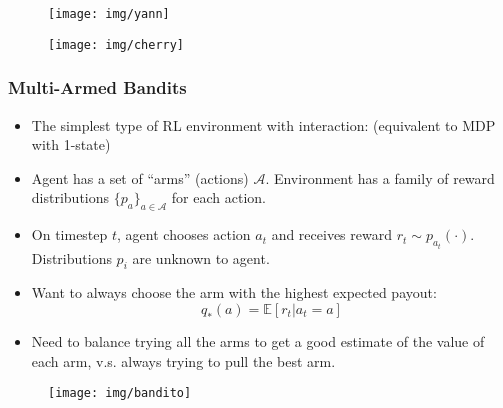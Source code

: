 \documentclass[10pt,a4paper]{beamer}
\newcommand{\A}{\mathcal{A}}
\begin{document}
 
\begin{frame}
\begin{figure}
	\centering
	\texttt{[image: img/yann]}
\end{figure}
\end{frame}
%
\begin{frame}
	\begin{figure}
	\texttt{[image: img/cherry]}
	\end{figure}
\end{frame}


\begin{frame}
	\frametitle{Multi-Armed Bandits}
	\begin{itemize}
		\item The simplest type of RL environment with interaction: (equivalent to
		MDP with 1-state)
		\pause
		\item Agent has a set of ``arms'' 
		(actions) $\A$. Environment has a family of reward distributions
		$\{p_a\}_{a \in \A}$ for each action.
		\pause
		\item On timestep $t$, agent chooses action $a_t$ and receives
		reward $r_t \sim p_{a_t}(\cdot)$. Distributions $p_i$ are unknown to agent.
		\pause
		\item Want to always choose the arm with the highest
		expected payout:
		$$
		q_*(a) = \mathbb{E}[r_t | a_t = a]
		$$
		\pause
		\item Need to balance trying all the arms to get a
		good estimate of the value of each arm, v.s. always trying
		to pull the best arm.
	\end{itemize}
\end{frame}

\begin{frame}
	\begin{figure}
		\centering
		\texttt{[image: img/bandito]}
		\label{fig:bandito}
	\end{figure}
\end{frame}
\end{document}
